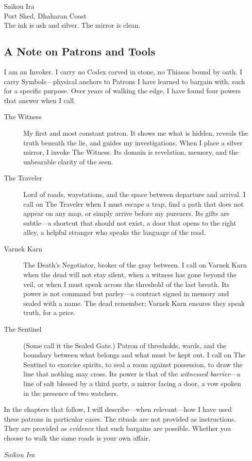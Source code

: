 \begin{flushright}
Saikou Ira\\
Port Shed, Dhaharan Coast\\
The ink is ash and silver. The mirror is clean.
\end{flushright}

\subsection*{A Note on Patrons and Tools}

I am an Invoker. I carry no Codex carved in stone, no Thiasos bound by oath. I carry Symbols---physical anchors to Patrons I have learned to bargain with, each for a specific purpose. Over years of walking the edge, I have found four powers that answer when I call.

\begin{description}
\item[The Witness] My first and most constant patron. It shows me what is hidden, reveals the truth beneath the lie, and guides my investigations. When I place a silver mirror, I invoke The Witness. Its domain is revelation, memory, and the unbearable clarity of the seen.

\item[The Traveler] Lord of roads, waystations, and the space between departure and arrival. I call on The Traveler when I must escape a trap, find a path that does not appear on any map, or simply arrive before my pursuers. Its gifts are subtle---a shortcut that should not exist, a door that opens to the right alley, a helpful stranger who speaks the language of the road.

\item[Varnek Karn] The Death's Negotiator, broker of the gray between. I call on Varnek Karn when the dead will not stay silent, when a witness has gone beyond the veil, or when I must speak across the threshold of the last breath. Its power is not command but parley---a contract signed in memory and sealed with a name. The dead remember; Varnek Karn ensures they speak truth, for a price.

\item[The Sentinel] (Some call it the Sealed Gate.) Patron of thresholds, wards, and the boundary between what belongs and what must be kept out. I call on The Sentinel to exorcise spirits, to seal a room against possession, to draw the line that nothing may cross. Its power is that of the \emph{witnessed barrier}---a line of salt blessed by a third party, a mirror facing a door, a vow spoken in the presence of two watchers.
\end{description}

In the chapters that follow, I will describe---when relevant---how I have used these patrons in particular cases. The rituals are not provided as instructions. They are provided as \emph{evidence} that such bargains are possible. Whether you choose to walk the same roads is your own affair.

\vspace{0.5cm}
\noindent\emph{Saikou Ira}